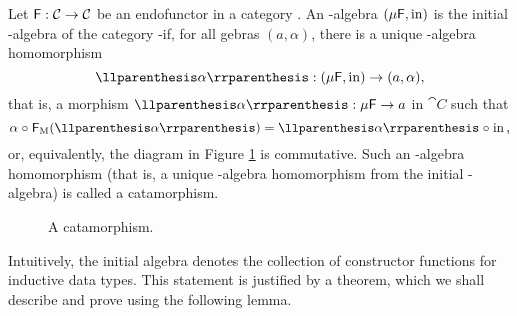 \begin{definition}
  \label{def:initial-algebra}


  Let $\mathsf{F}: \mathcal{C} \to \mathcal{C}$ be an endofunctor in a category
  . An -algebra $(\mu\mathsf{F},\operatorname{in})$ is the initial
  -algebra of the category -\alg if, for all
  \-ge\-bras $(a,\alpha)$, there is a unique
  -algebra homomorphism
  \begin{equation*}
    \cata\alpha: (\mu\func{F},\inmo) \to (a,\alpha)
    \text{,}
  \end{equation*}
  that is, a morphism $\cata\alpha: \mu\func{F} \to a$ in $\cat{C}$
  such that
  \begin{equation}
    \label{eq:cata-charn}
    \alpha \comp \funcM{F}(\cata\alpha) = \cata\alpha \comp \inmo
    \text{,}
  \end{equation}
  or, equivalently, the diagram in Figure \ref{fig:cata-charn} is
  commutative. Such an -al\-ge\-bra homomorphism (that is, a
  unique -algebra homomorphism from the initial
  -algebra) is called a catamorphism.

  \begin{figure}[htb]
    \begin{center}
    \end{center}
    \caption{A catamorphism.}
    \label{fig:cata-charn}
  \end{figure}

\end{definition}

Intuitively, the initial algebra denotes the collection of constructor
functions for inductive data types. This statement is justified by a
theorem, which we shall describe and prove using the following lemma.


